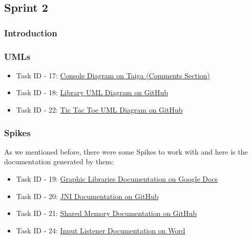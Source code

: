 \subsection{Sprint 2}

\subsubsection{Introduction}

\subsubsection{UMLs}

\begin{itemize}
    \item Task ID - 17: \href{https://tree.taiga.io/project/joseluis-teran-coffeetime/us/17?milestone=392128}{Console Diagram on Taiga (Comments Section)}
    \item Task ID - 18: \href{https://github.com/Pending-Name-21/arquitecture/pull/2}{Library UML Diagram on GitHub}
    \item Task ID - 22: \href{https://github.com/Pending-Name-21/arquitecture/pull/3}{Tic Tac Toe UML Diagram on GitHub}
\end{itemize}

\subsubsection{Spikes}

As we mentioned before, there were some Spikes to work with and here is the documentation generated by them:

\begin{itemize}    
    \item Task ID - 19: \href{https://docs.google.com/document/d/1a6wyQA0LM5thyAfOsWnkG-fTLcThvrsVPOGmFcoqkvw/edit?usp=sharing}{Graphic Libraries Documentation on Google Docs}
    \item Task ID - 20: \href{https://github.com/Pending-Name-21/console/tree/vm-spikes/jni_spike}{JNI Documentation on GitHub}
    \item Task ID - 21: \href{https://github.com/Pending-Name-21/console/blob/vm-spikes/shared-memory/README.md}{Shared Memory Documentation on GitHub}
    \item Task ID - 24: \href{https://universidadsalesian-my.sharepoint.com/:w:/g/personal/axel_ayala_9412013_usalesiana_edu_bo/EZlHobuXqW5AmffmDNnGaKYBdpordz1QlVJk88Pe_6S7HQ?e=DymfMq}{Input Listener Documentation on Word}
\end{itemize}

